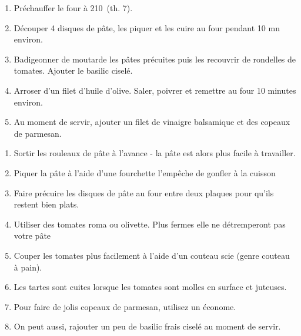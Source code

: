 
\begin{ingredients}
\end{ingredients}


\begin{recipe}
  \begin{enumerate}

  \item Pr\'echauffer le four \`a 210\C\ (th. 7).

  \item D\'ecouper 4 disques de p\^ate, les piquer et les cuire au
    four pendant 10 mn environ.

  \item Badigeonner de moutarde les p\^ates pr\'ecuites puis les
    recouvrir de rondelles de tomates. Ajouter le basilic cisel\'e.


  \item Arroser d'un filet d'huile d'olive. Saler, poivrer et remettre
    au four 10 minutes environ.

  \item Au moment de servir, ajouter un filet de vinaigre balsamique
    et des copeaux de parmesan.

  \end{enumerate}

\end{recipe}

\begin{enumerate}

\item Sortir les rouleaux de p\^ate \`a l'avance - la p\^ate est alors
  plus facile \`a travailler.

\item Piquer la p\^ate \`a l'aide d'une fourchette l'empêche de
  gonfler \`a la cuisson

\item Faire pr\'ecuire les disques de p\^ate au four entre deux
  plaques pour qu'ils restent bien plats.

\item Utiliser des tomates roma ou olivette. Plus fermes
  elle ne d\'etremperont pas votre p\^ate

\item Couper les tomates plus facilement \`a l'aide d'un couteau scie
  (genre couteau \`a pain).

\item Les tartes sont cuites lorsque les tomates sont molles en
  surface et juteuses.

\item Pour faire de jolis copeaux de parmesan, utilisez un
  \'econome.

\item On peut aussi, rajouter un peu de basilic frais cisel\'e au
  moment de servir.

\end{enumerate}